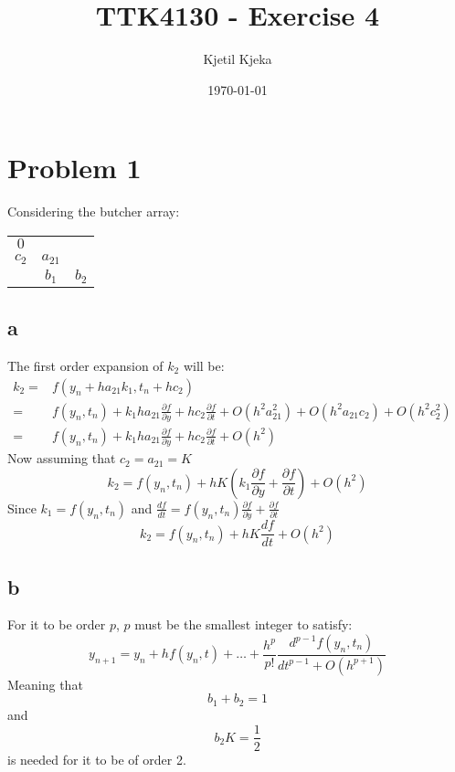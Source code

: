 \documentclass[11pt]{article}
\author{Kjetil Kjeka}
\title{TTK4130 - Exercise 4}
\date{\today}
\begin{document}
\maketitle
\section*{Problem 1}
Considering the butcher array: \\
\begin{tabular}{c|c c}
$0$ & & \\
$c_2$ & $a_{21}$ & \\ \hline
& $b_1$ & $b_2$
\end{tabular}
\subsection*{a}
The first order expansion of $k_2$ will be:
\begin{eqnarray*}
k_2 =& f(y_n + h a_{21} k_1, t_n + h c_2) &\\
=& f(y_n, t_n) + k_1 h a_{21} \frac{\partial f}{\partial y} + h c_2 \frac{\partial f}{\partial t} + O(h^2 a_{21}^2) + O(h^2 a_{21} c_2) + O(h^2 c_2^2) &\\
=& f(y_n, t_n) + k_1 h a_{21} \frac{\partial f}{\partial y} + h c_2 \frac{\partial f}{\partial t} + O(h^2) &
\end{eqnarray*}
Now assuming that $c_2 = a_{21} = K$ 
\[k_2 = f(y_n, t_n) + hK( k_1\frac{\partial f}{\partial y} + \frac{\partial f}{\partial t}) + O(h^2)\]
Since $k_1 = f(y_n, t_n)$ and $\frac{df}{dt} = f(y_n, t_n) \frac{\partial f}{\partial y} + \frac{\partial f}{\partial t}$
\[k_2 = f(y_n, t_n) + hK \frac{df}{dt} + O(h^2) \]


\subsection*{b}
For it to be order $p$, $p$ must be the smallest integer to satisfy:
\[ y_{n+1} = y_n + h f(y_n, t) + \dots + \frac{h^p}{p!} \frac{d^{p-1} f(y_n, t_n)}{dt^{p-1} + O(h^{p+1})} \]
Meaning that 
\[b_1 + b_2 = 1\] 
and 
\[b_2K = \frac{1}{2}\]
is needed for it to be of order 2.
\end{document}
